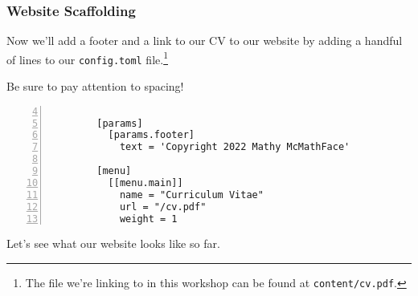 \begin{frame}[fragile]
    \frametitle{Website Scaffolding}

    Now we'll add a footer and a link to our CV to our website by adding a handful of lines to our \texttt{config.toml} 
    file.\footnote{
      The file we're linking to in this workshop can be found at \texttt{content/cv.pdf}.
    } 

    \bigskip
    
    Be sure to pay attention to spacing!

    \smallskip

    \begin{lstlisting}[style=saneCode,gobble=8,title={config.toml},numbers=left,firstnumber=4]
        
        [params]
          [params.footer]
            text = 'Copyright 2022 Mathy McMathFace'
        
        [menu]
          [[menu.main]]
            name = "Curriculum Vitae"
            url = "/cv.pdf"
            weight = 1
    \end{lstlisting}

    \smallskip

    Let's see what our website looks like so far.
    \vfill
\end{frame}